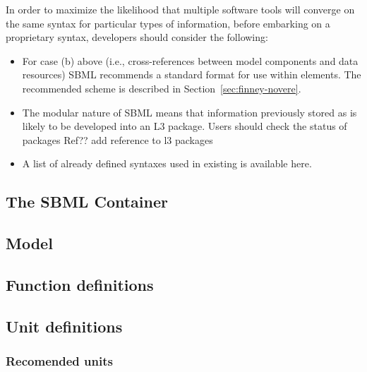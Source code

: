 In order to maximize the likelihood that multiple software
tools will converge on the same syntax for particular types
of information, before embarking on a proprietary syntax, 
developers should consider the following:
\begin{itemize}

\item  For case (b) above (i.e., cross-references between model
  components and data resources) SBML \thisLV recommends a
  standard format for use within 
  elements.  The recommended scheme is described in
  Section~\ref{sec:finney-novere}.  
  
\item  The modular nature of SBML \thisLV means that information
  previously stored as  is likely to be developed
  into an L3 package.  Users should check the status of packages Ref??
   {add reference to l3 packages}
  
\item  A list of already defined syntaxes used in existing 
   is available here.   

\end{itemize}



\subsection{The SBML Container}
\label{sec:bp:sbml}

\subsection{Model}
\label{sec:bp:model}


\subsection{Function definitions}
\label{sec:bp:functions}

\subsection{Unit definitions}
\label{sec:bp:unitdefinitions}

\subsubsection{Recomended units}
\label{sec:bp:unitdefinitions:recommendedunits}


